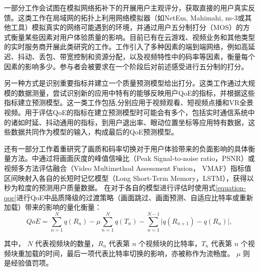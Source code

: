 一部分工作会试图在模拟网络拓补下的开展用户主观评分，获取直接的用户真实反馈。这类工作在局域网的拓扑上利用网络模拟器（如NetEm\cite{hemminger2005network}, Mahimahi\cite{netravali2015mahimahi}, ns-3\cite{henderson2008network}或其他工具）模拟真实的网络可能遇到的环境，并通过用户五分制打分（MOS）\cite{林闯2012用户体验质量}的方式衡量某些因素对用户体验质量的影响。目前已有在云游戏、视频业务和其他类型的实时服务商开展此类研究的工作\cite{jarschel2011evaluation,ahmad2023significance,zadtootaghaj2018modeling,zhang2019e2e,lindstrom2020cloud}。工作引入了多种因素的端到端网络，例如高延迟、抖动、丢包、带宽控制和资源分配，以及视频特性中的码率等因素，衡量每个因素的影响多少。参与者会被要求在一个阶段后对前述感受进行五分制的打分。

另一种方式是识别重要指标并建立一个质量预测模型给出打分。这类工作通过大规模的数据测量，尝试识别新的应用中特有的能够反映用户QoE的指标，并根据这些指标建立预测模型。这一类工作包括\cite{balachandran2013developing,cheng2023rebuffering,zhu2022eyeqoe},分别应用于视频观看、短视频点播和VR全景视频。用于评估QoE的指标在建立预测模型时可能会有多个，包括实时通信系统中的诸如时延、抖动通用的指标，到用户退出率、眼动位置坐标等应用特有数据，这些数据共同作为模型的输入，构成最后的QoE预测模型。

还有一部分工作着重研究了画质和码率切换对于用户体验带来的负面影响的具体衡量方法。\cite{slivar2016cloud,jamshidi2022deep,utke2022ndnetgaming}中通过将画面灰度的峰值信噪比（Peak Signal-to-noise ratio，PSNR）或视频多方法评估融合（Video Multimethod Assessment Fusion， VMAF）指标值区间映射入各自的长短时记忆模型（Long Short-Term Memory，LSTM），获得以秒为粒度的预测用户质量数据。
\cite{mao2017neural,huang2019comyco,nathan2019end}在对于各自的模型进行评估时使用式\eqref{equation-qoe}进行QoE中品质降级的过渡策略（画面跳过、画面预测、自适应比特率或重新加载）带来的影响的量化衡量：
\begin{equation}
    QoE = \sum_{n=1}^{N}q(R_n) - \mu \sum_{n=1}^{N}q(T_n) - \sum_{n=1}^{N-1}\lvert q(R_{n+1})-q(R_n) \rvert,
\label{equation-qoe}
\end{equation}

其中， $N$ 代表视频块的数量，$R_n$ 代表第 $n$ 个视频块的比特率，$T_n$ 代表第 $n$ 个视频块重加载的时间，最后一项代表比特率切换的影响，亦被称作为流畅度。 $\mu$ 则是经验值罚项。


